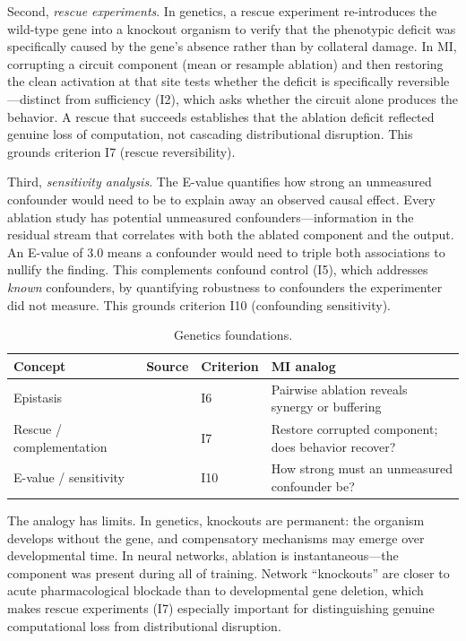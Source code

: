 \documentclass{article}
\begin{document}
Second, \emph{rescue experiments}. In genetics, a rescue experiment re-introduces the wild-type gene into a knockout organism to verify that the phenotypic deficit was specifically caused by the gene's absence rather than by collateral damage. In MI, corrupting a circuit component (mean or resample ablation) and then restoring the clean activation at that site tests whether the deficit is specifically reversible---distinct from sufficiency (I2), which asks whether the circuit alone produces the behavior. A rescue that succeeds establishes that the ablation deficit reflected genuine loss of computation, not cascading distributional disruption. This grounds criterion I7 (rescue reversibility).

Third, \emph{sensitivity analysis}. The E-value quantifies how strong an unmeasured confounder would need to be to explain away an observed causal effect. Every ablation study has potential unmeasured confounders---information in the residual stream that correlates with both the ablated component and the output. An E-value of 3.0 means a confounder would need to triple both associations to nullify the finding. This complements confound control (I5), which addresses \emph{known} confounders, by quantifying robustness to confounders the experimenter did not measure. This grounds criterion I10 (confounding sensitivity).

\begin{table}[H]
\centering\small
\caption{Genetics foundations.}
\renewcommand{\arraystretch}{1.12}
\begin{tabular}{@{}l>{\raggedright\arraybackslash}p{2.2cm}l>{\raggedright\arraybackslash}p{4.5cm}@{}}
\toprule
\textbf{Concept} & \textbf{Source} & \textbf{Criterion} & \textbf{MI analog} \\
\midrule
Epistasis & \citet{fisher1918correlation} & I6 & Pairwise ablation reveals synergy or buffering \\
\midrule
Rescue / complementation & \citet{brenner1974genetics} & I7 & Restore corrupted component; does behavior recover? \\
\midrule
E-value / sensitivity & \citet{vanderweele2017sensitivity} & I10 & How strong must an unmeasured confounder be? \\
\bottomrule
\end{tabular}
\end{table}

The analogy has limits. In genetics, knockouts are permanent: the organism develops without the gene, and compensatory mechanisms may emerge over developmental time. In neural networks, ablation is instantaneous---the component was present during all of training. Network ``knockouts'' are closer to acute pharmacological blockade than to developmental gene deletion, which makes rescue experiments (I7) especially important for distinguishing genuine computational loss from distributional disruption.
\end{document}
